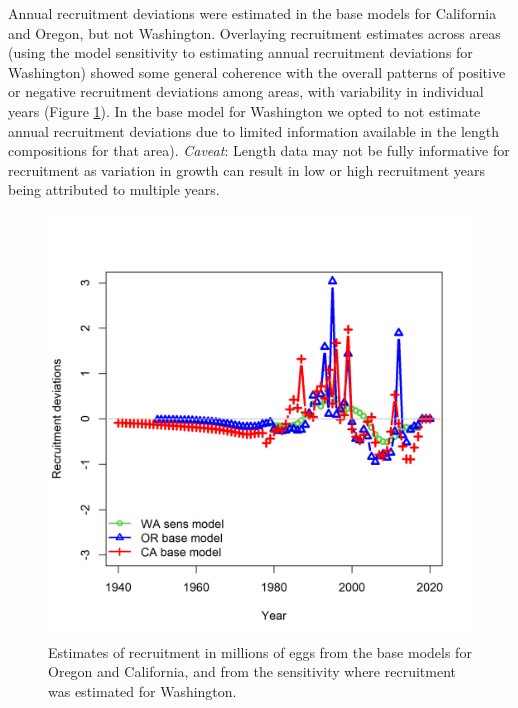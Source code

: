 \documentclass[11pt,
  english,
  letterpaper,
]{article}
\begin{document}
Annual recruitment deviations were estimated in the base models for California and Oregon, but not Washington. Overlaying recruitment estimates across areas (using the model sensitivity to estimating annual recruitment deviations for Washington) showed some general coherence with the overall patterns of positive or negative recruitment deviations among areas, with variability in individual years (Figure \ref{fig:recruit-comparison}). In the base model for Washington we opted to not estimate annual recruitment deviations due to limited information available in the length compositions for that area). \emph{Caveat}: Length data may not be fully informative for recruitment as variation in growth can result in low or high recruitment years being attributed to multiple years.

\leavevmode\tagmcend\tagstructend\par


\begin{figure}
\centering
\includegraphics[width=1\textwidth,height=1\textheight]{comprare_recruitments.png}
\caption{Estimates of recruitment in millions of eggs from the base models for Oregon and California, and from the sensitivity where recruitment was estimated for Washington.\label{fig:recruit-comparison}}
\end{figure}
\end{document}
